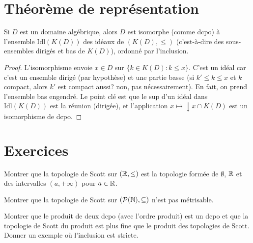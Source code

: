 \section{Th\'eor\`eme de repr\'esentation}

\begin{theoreme}
Si $D$ est un domaine alg\'ebrique, alors $D$ est isomorphe (comme dcpo) \`a l'ensemble
$\mathrm{Idl}(K(D))$ des id\'eaux de $(K(D), \leq)$ (c'est-\`a-dire des sous-ensembles
dirig\'es et bas de $K(D)$), ordonn\'e par l'inclusion.
\end{theoreme}

\begin{proof}
L'isomorphisme envoie $x \in D$ sur $\{k \in K(D) : k \leq x\}$. C'est un id\'eal car
c'est un ensemble dirig\'e (par hypoth\`ese) et une partie basse (si $k' \leq k \leq x$
et $k$ compact, alors $k'$ est compact aussi? non, pas n\'ecessairement). En fait, on
prend l'ensemble bas engendr\'e. Le point cl\'e est que le sup d'un id\'eal dans
$\mathrm{Idl}(K(D))$ est la r\'eunion (dirig\'ee), et l'application $x \mapsto
\downarrow\! x \cap K(D)$ est un isomorphisme de dcpo.
\end{proof}

\section{Exercices}

\begin{exercice}
Montrer que la topologie de Scott sur $(\mathbb{R}, \leq)$ est la topologie form\'ee de
$\emptyset$, $\mathbb{R}$ et des intervalles $(a, +\infty)$ pour $a \in \mathbb{R}$.
\end{exercice}

\begin{exercice}
Montrer que la topologie de Scott sur $(\mathcal{P}(\mathbb{N}), \subseteq)$ n'est pas m\'etrisable.
\end{exercice}

\begin{exercice}
Montrer que le produit de deux dcpo (avec l'ordre produit) est un dcpo et que la topologie
de Scott du produit est plus fine que le produit des topologies de Scott. Donner un exemple
o\`u l'inclusion est stricte.
\end{exercice}

